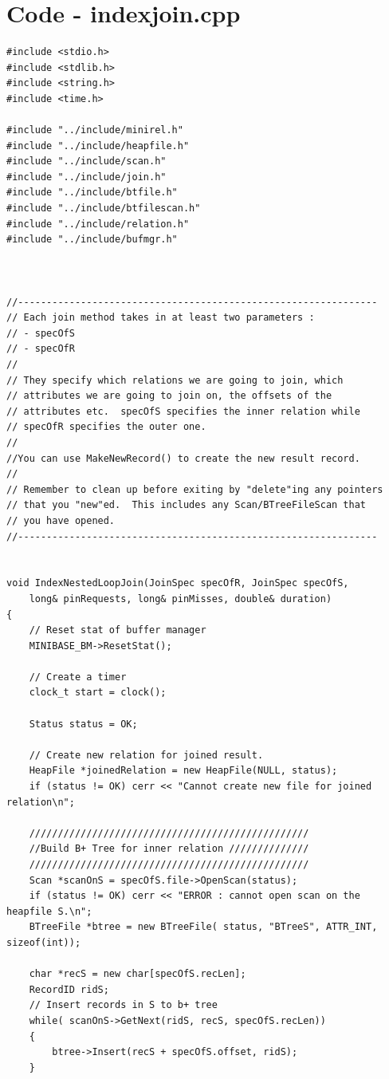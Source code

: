 \documentclass{article}
\begin{document}
\section{Code - indexjoin.cpp}
\begin{lstlisting}
#include <stdio.h>
#include <stdlib.h>
#include <string.h>
#include <time.h>

#include "../include/minirel.h"
#include "../include/heapfile.h"
#include "../include/scan.h"
#include "../include/join.h"
#include "../include/btfile.h"
#include "../include/btfilescan.h"
#include "../include/relation.h"
#include "../include/bufmgr.h"



//---------------------------------------------------------------
// Each join method takes in at least two parameters :
// - specOfS
// - specOfR
//
// They specify which relations we are going to join, which 
// attributes we are going to join on, the offsets of the 
// attributes etc.  specOfS specifies the inner relation while
// specOfR specifies the outer one.
//
//You can use MakeNewRecord() to create the new result record.
//
// Remember to clean up before exiting by "delete"ing any pointers
// that you "new"ed.  This includes any Scan/BTreeFileScan that 
// you have opened.
//---------------------------------------------------------------


void IndexNestedLoopJoin(JoinSpec specOfR, JoinSpec specOfS, 
	long& pinRequests, long& pinMisses, double& duration)
{
	// Reset stat of buffer manager
	MINIBASE_BM->ResetStat();

	// Create a timer
	clock_t start = clock();

	Status status = OK;

	// Create new relation for joined result.
	HeapFile *joinedRelation = new HeapFile(NULL, status); 
	if (status != OK) cerr << "Cannot create new file for joined relation\n";

	/////////////////////////////////////////////////
	//Build B+ Tree for inner relation //////////////
	/////////////////////////////////////////////////
	Scan *scanOnS = specOfS.file->OpenScan(status);
	if (status != OK) cerr << "ERROR : cannot open scan on the heapfile S.\n";
	BTreeFile *btree = new BTreeFile( status, "BTreeS", ATTR_INT, sizeof(int));

	char *recS = new char[specOfS.recLen];
	RecordID ridS;
	// Insert records in S to b+ tree
	while( scanOnS->GetNext(ridS, recS, specOfS.recLen))
	{
		btree->Insert(recS + specOfS.offset, ridS);
	}


\end{lstlisting}
\end{document}
